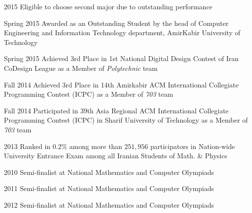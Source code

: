 \documentclass[]{friggeri-cv} %
\begin{document}
\begin{entrylist}


\entry
{2015}
{{\normalfont Eligible to choose} \textcolor{TextGreen}{second major} {\normalfont due to outstanding performance}}
{}
{}


\entry
{Spring 2015}
{\normalfont Awarded as an Outstanding Student by the head of Computer Engineering and Information Technology department, AmirKabir University of Technology}
{}
{}


\entry
{Spring 2015}
{{\normalfont Achieved} \textcolor{TextYellow}{3rd} {\normalfont Place in 1st National Digital Design Contest of Iran CoDesign League as a Member of \emph{Polytechnic} team}}
{}
{}


\entry
{Fall 2014}
{{\normalfont Achieved} \textcolor{UniBlue}{3rd} {\normalfont Place in 14th Amirkabir ACM International Collegiate Programming Contest (ICPC) as a Member of \emph{703} team}}
{}
{}


\entry
{Fall 2014}
{\normalfont Participated in 39th Asia Regional ACM International Collegiate Programming Contest (ICPC) in Sharif University of Technology as a Member of \emph{703} team}
{}
{}


\entry
{2013}
{\normalfont Ranked in $0.2\%$ among more than $251,956$ participators in Nation-wide University Entrance Exam among all Iranian Students of Math. \& Physics}
{}
{}


\entry
{2010}
{\textcolor{TextOrange}{Semi-finalist} {\normalfont at National Mathematics and Computer Olympiads}}
{}
{}


\entry
{2011}
{\textcolor{TextOrange}{Semi-finalist} {\normalfont at National Mathematics and Computer Olympiads}}
{}
{}


\entry
{2012}
{\textcolor{TextOrange}{Semi-finalist} {\normalfont at National Mathematics and Computer Olympiads}}
{}
{}


\end{entrylist}
\end{document}
